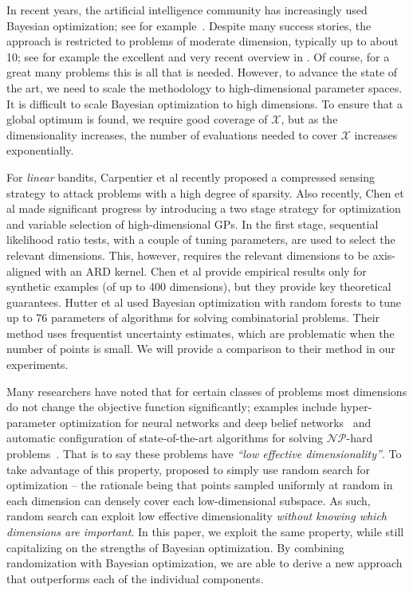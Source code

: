 \documentclass{article}
\begin{document}
In recent years, the artificial intelligence community has increasingly used Bayesian optimization;
see for example~\cite{Martinez-Cantin:2009,Brochu:2009,Srinivas:2010,Hoffman:2011,Lizotte:2011,Azimi:2012}. 
Despite many success stories, the approach is restricted to problems of moderate dimension, typically up to about 10; see for example the excellent and very recent overview in \cite{Snoek:2012}. Of course, for a great many problems this is all that is needed. However, to advance the state of the art, we need to scale the methodology to high-dimensional parameter spaces. 
It is difficult to scale Bayesian optimization to high dimensions. To ensure that a global optimum is found, we require good coverage of $\mathcal{X}$, but as the dimensionality increases, the number of evaluations needed to cover $\mathcal{X}$ increases exponentially. 

For \emph{linear} bandits, Carpentier et al  recently proposed a compressed sensing strategy to attack problems with a high degree of sparsity. 
Also recently, Chen et al  made significant progress by introducing a two stage strategy for optimization and variable selection of high-dimensional GPs. In the first stage, sequential likelihood ratio tests, with a couple of tuning parameters, are used to select the relevant dimensions. 
This, however, requires the relevant dimensions to be axis-aligned with an ARD kernel. Chen et al provide empirical results only for synthetic examples (of up to 400 dimensions), but they provide key theoretical guarantees. Hutter et al  used Bayesian optimization with random forests to tune up to 76 parameters of algorithms for solving combinatorial problems. Their method uses frequentist uncertainty estimates, which are problematic when the number of points is small. 
We will provide a comparison to their method in our experiments.

Many researchers have noted that for certain classes of problems most dimensions do not change the objective function significantly; examples include hyper-parameter optimization for neural networks and deep belief networks~\cite{Bergstra:2012} and automatic configuration of state-of-the-art algorithms for solving $\mathcal{NP}$-hard 
problems~\cite{Hutter:2009}.
That is to say these problems have \emph{``low effective dimensionality''}. To take advantage of this property, \cite{Bergstra:2012} proposed to simply use random search for optimization -- the rationale being that points sampled uniformly at random in each dimension can densely cover each low-dimensional subspace. As such, random search can exploit low effective dimensionality \emph{without knowing which dimensions are important}. In this paper, we exploit the same property, while still capitalizing on the strengths of Bayesian optimization. By combining randomization with Bayesian optimization, we are able to derive a new approach that outperforms each of the individual components.
\end{document}
